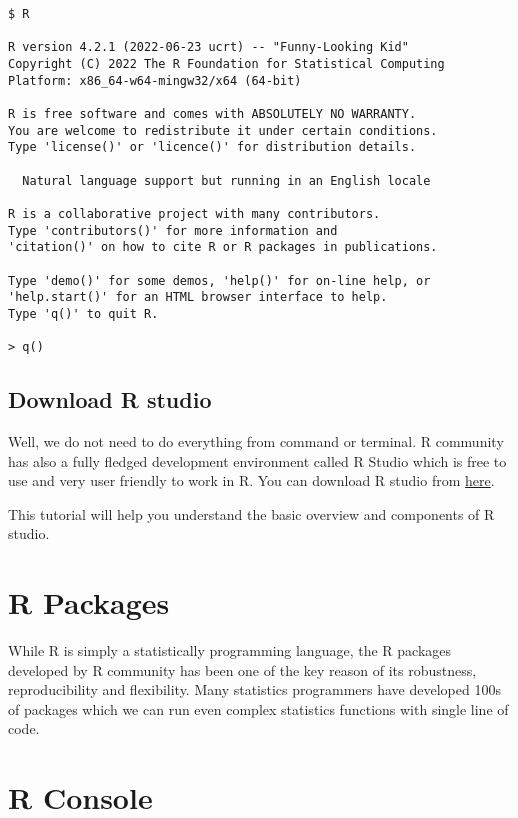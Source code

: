 \documentclass[
]{book}
\begin{document}
\begin{verbatim}
$ R

R version 4.2.1 (2022-06-23 ucrt) -- "Funny-Looking Kid"
Copyright (C) 2022 The R Foundation for Statistical Computing
Platform: x86_64-w64-mingw32/x64 (64-bit)

R is free software and comes with ABSOLUTELY NO WARRANTY.
You are welcome to redistribute it under certain conditions.
Type 'license()' or 'licence()' for distribution details.

  Natural language support but running in an English locale

R is a collaborative project with many contributors.
Type 'contributors()' for more information and
'citation()' on how to cite R or R packages in publications.

Type 'demo()' for some demos, 'help()' for on-line help, or
'help.start()' for an HTML browser interface to help.
Type 'q()' to quit R.

> q()
\end{verbatim}

\hypertarget{download-r-studio}{%
\subsection{Download R studio}\label{download-r-studio}}

Well, we do not need to do everything from command or terminal. R community has also a fully fledged development environment called R Studio which is free to use and very user friendly to work in R. You can download R studio from \href{https://posit.co/download/rstudio-desktop/}{here}.

This tutorial will help you understand the basic overview and components of R studio.

\hypertarget{r-packages}{%
\section{R Packages}\label{r-packages}}

While R is simply a statistically programming language, the R packages developed by R community has been one of the key reason of its robustness, reproducibility and flexibility. Many statistics programmers have developed 100s of packages which we can run even complex statistics functions with single line of code.

\hypertarget{r-console}{%
\section{R Console}\label{r-console}}
\end{document}
